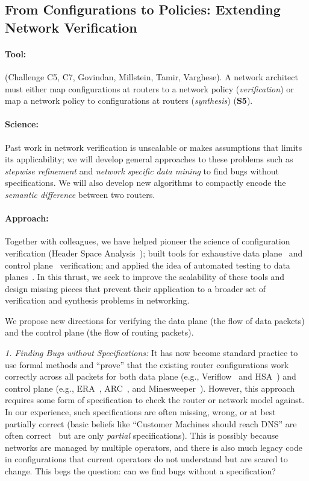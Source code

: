 
\subsection{From Configurations to Policies: Extending Network Verification}

\paragraph*{Tool:} (Challenge C5, C7, Govindan, Millstein, Tamir, Varghese). A network architect must either map configurations at routers to a network policy ({\em verification}) or map a network policy to configurations at routers ({\em synthesis}) ({\bf S5}).

\paragraph*{Science:} Past work in network verification is unscalable or makes assumptions that limits its applicability; we will develop general approaches to these problems such as {\em stepwise refinement} and {\em network specific
data mining} to find bugs without specifications. We will also develop new algorithms to compactly encode the
{\em semantic difference} between two routers.

\paragraph*{Approach:}

Together with colleagues, we have helped pioneer the science of configuration verification (Header Space Analysis~\cite{hsa}); built tools for exhaustive data plane~\cite{hsa,netplumber,nod} and control plane~\cite{batfish,era} verification; and applied the idea of automated testing to data planes~\cite{atpg}.  In this thrust, we seek to improve the scalability of these tools and design missing pieces that prevent their application to a broader set of verification and synthesis problems in networking.

We propose new directions for verifying the data plane (the flow of data packets) and the control plane (the flow of routing packets).

{\em 1. Finding Bugs without Specifications:} It has now become standard practice to use formal methods and ``prove'' that the existing router configurations work correctly across all packets for both data plane (e.g., Veriflow~\cite{veriflow} and HSA~\cite{hsa}) and control plane (e.g., ERA~\cite{era}, ARC~\cite{arc}, and Minesweeper~\cite{minesweeper}).  However, this approach requires some form of specification to check the router or network model against.  In our experience, such specifications are often missing, wrong, or at best partially correct (basic beliefs
like ``Customer Machines should reach DNS'' are often correct~\cite{nod} but are only {\em partial} specifications). This is possibly because networks are managed by multiple operators, and there is also much legacy code in configurations that current operators do not understand but are scared to change.  This begs the question: can we find bugs without a specification?

